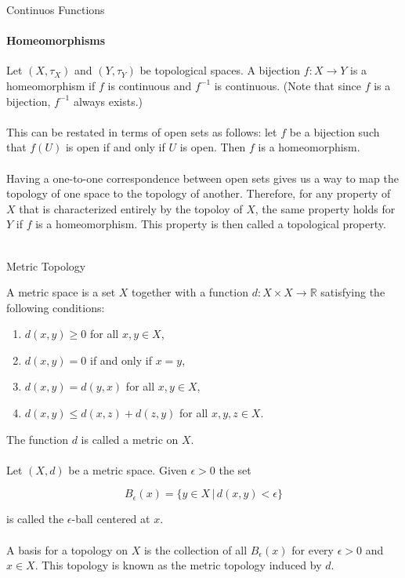 \documentclass[pdf]{beamer}
\begin{document}
    \begin{frame}{Continuos Functions}
        \framesubtitle{Homeomorphisms}
        
        Let $(X, \tau_X)$ and $(Y, \tau_Y)$ be topological spaces. A bijection $f: X \to Y$ is a 
        {\color{red} homeomorphism} if $f$ is continuous and $f^{-1}$ is continuous. (Note that 
        since $f$ is a bijection, $f^{-1}$ always exists.) \\~\\

        This can be restated in terms of open sets as follows: let $f$ be a bijection such that 
        $f(U)$ is open if and only if $U$ is open. Then $f$ is a homeomorphism. \\~\\

        Having a one-to-one correspondence between open sets gives us a way to map the topology
        of one space to the topology of another. Therefore, for any property of $X$ that is characterized
        entirely by the topoloy of $X$, the same property holds for $Y$ if $f$ is a homeomorphism. This
        property is then called a {\color{red} topological property}. \\~\\
        
    \end{frame}

    \begin{frame}{Metric Topology}
        
        A {\color{red} metric space} is a set $X$ together with a function $d: X \times X \to \mathbb{R}$
        satisfying the following conditions:
        \begin{enumerate}
            \item $d(x, y) \geq 0$ for all $x, y \in X$,
            \item $d(x, y) = 0$ if and only if $x = y$,
            \item $d(x, y) = d(y, x)$ for all $x, y \in X$,
            \item $d(x, y) \leq d(x, z) + d(z, y)$ for all $x, y, z \in X$.
        \end{enumerate}
        The function $d$ is called a {\color{red} metric} on $X$. \\~\\

        Let $(X, d)$ be a metric space. Given $\epsilon > 0$ the set 

        \[
            B_\epsilon(x) = \{y \in X \,|\, d(x, y) < \epsilon\}    
        \]

        is called the {\color{red} $\epsilon$-ball} centered at $x$. \\~\\

        A basis for a topology on $X$ is the collection of all $B_\epsilon(x)$
        for every $\epsilon > 0$ and $x \in X$. This topology is known as the 
        {\color{red} metric topology} induced by $d$. \\~\\
        
    \end{frame}
\end{document}
